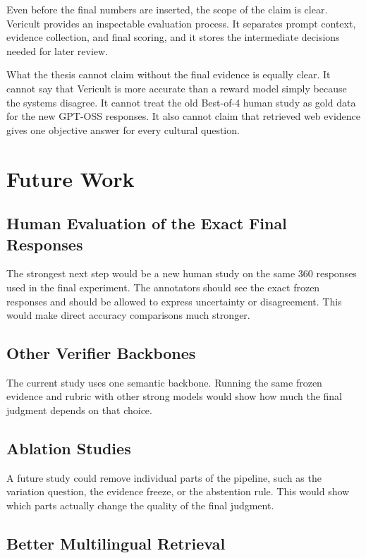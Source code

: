 Even before the final numbers are inserted, the scope of the claim is clear. Vericult provides an inspectable evaluation process. It separates prompt context, evidence collection, and final scoring, and it stores the intermediate decisions needed for later review.

What the thesis cannot claim without the final evidence is equally clear. It cannot say that Vericult is more accurate than a reward model simply because the systems disagree. It cannot treat the old Best-of-4 human study as gold data for the new GPT-OSS responses. It also cannot claim that retrieved web evidence gives one objective answer for every cultural question.

\section{Future Work}

\subsection{Human Evaluation of the Exact Final Responses}

The strongest next step would be a new human study on the same 360 responses used in the final experiment. The annotators should see the exact frozen responses and should be allowed to express uncertainty or disagreement. This would make direct accuracy comparisons much stronger.

\subsection{Other Verifier Backbones}

The current study uses one semantic backbone. Running the same frozen evidence and rubric with other strong models would show how much the final judgment depends on that choice.

\subsection{Ablation Studies}

A future study could remove individual parts of the pipeline, such as the variation question, the evidence freeze, or the abstention rule. This would show which parts actually change the quality of the final judgment.

\subsection{Better Multilingual Retrieval}

